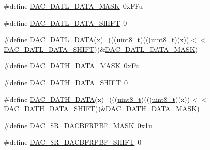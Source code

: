 \begin{DoxyCompactItemize}
\#define \hyperlink{group___d_a_c___register___masks_ga1874318b69ed4b2d190e887ed43e39bf}{D\+A\+C\+\_\+\+D\+A\+T\+L\+\_\+\+D\+A\+T\+A\+\_\+\+M\+A\+SK}~0x\+F\+Fu
\item 
\#define \hyperlink{group___d_a_c___register___masks_ga3c93e96482e5e842d2232a78bcdefa17}{D\+A\+C\+\_\+\+D\+A\+T\+L\+\_\+\+D\+A\+T\+A\+\_\+\+S\+H\+I\+FT}~0
\item 
\#define \hyperlink{group___d_a_c___register___masks_ga2923650bda04d892a226840bdadaeec7}{D\+A\+C\+\_\+\+D\+A\+T\+L\+\_\+\+D\+A\+TA}(x)                                              ~(((\hyperlink{_p_e___types_8h_aba7bc1797add20fe3efdf37ced1182c5}{uint8\+\_\+t})(((\hyperlink{_p_e___types_8h_aba7bc1797add20fe3efdf37ced1182c5}{uint8\+\_\+t})(x))$<$$<$\hyperlink{group___d_a_c___register___masks_ga3c93e96482e5e842d2232a78bcdefa17}{D\+A\+C\+\_\+\+D\+A\+T\+L\+\_\+\+D\+A\+T\+A\+\_\+\+S\+H\+I\+FT}))\&\hyperlink{group___d_a_c___register___masks_ga1874318b69ed4b2d190e887ed43e39bf}{D\+A\+C\+\_\+\+D\+A\+T\+L\+\_\+\+D\+A\+T\+A\+\_\+\+M\+A\+SK})
\item 
\#define \hyperlink{group___d_a_c___register___masks_ga2d3ae44d77c6c039e134b60f5d0b8c70}{D\+A\+C\+\_\+\+D\+A\+T\+H\+\_\+\+D\+A\+T\+A\+\_\+\+M\+A\+SK}~0x\+Fu
\item 
\#define \hyperlink{group___d_a_c___register___masks_ga108839fa938503d4fe96793470af0565}{D\+A\+C\+\_\+\+D\+A\+T\+H\+\_\+\+D\+A\+T\+A\+\_\+\+S\+H\+I\+FT}~0
\item 
\#define \hyperlink{group___d_a_c___register___masks_ga309894cfd52375341853b92ef9ce427c}{D\+A\+C\+\_\+\+D\+A\+T\+H\+\_\+\+D\+A\+TA}(x)                                              ~(((\hyperlink{_p_e___types_8h_aba7bc1797add20fe3efdf37ced1182c5}{uint8\+\_\+t})(((\hyperlink{_p_e___types_8h_aba7bc1797add20fe3efdf37ced1182c5}{uint8\+\_\+t})(x))$<$$<$\hyperlink{group___d_a_c___register___masks_ga108839fa938503d4fe96793470af0565}{D\+A\+C\+\_\+\+D\+A\+T\+H\+\_\+\+D\+A\+T\+A\+\_\+\+S\+H\+I\+FT}))\&\hyperlink{group___d_a_c___register___masks_ga2d3ae44d77c6c039e134b60f5d0b8c70}{D\+A\+C\+\_\+\+D\+A\+T\+H\+\_\+\+D\+A\+T\+A\+\_\+\+M\+A\+SK})
\item 
\#define \hyperlink{group___d_a_c___register___masks_ga5af56fd75a9c5b74fe07c8f303d452aa}{D\+A\+C\+\_\+\+S\+R\+\_\+\+D\+A\+C\+B\+F\+R\+P\+B\+F\+\_\+\+M\+A\+SK}~0x1u
\item 
\#define \hyperlink{group___d_a_c___register___masks_ga5581f254327f3d4e57b161b5c771fb1c}{D\+A\+C\+\_\+\+S\+R\+\_\+\+D\+A\+C\+B\+F\+R\+P\+B\+F\+\_\+\+S\+H\+I\+FT}~0
\item 

\end{DoxyCompactItemize}

